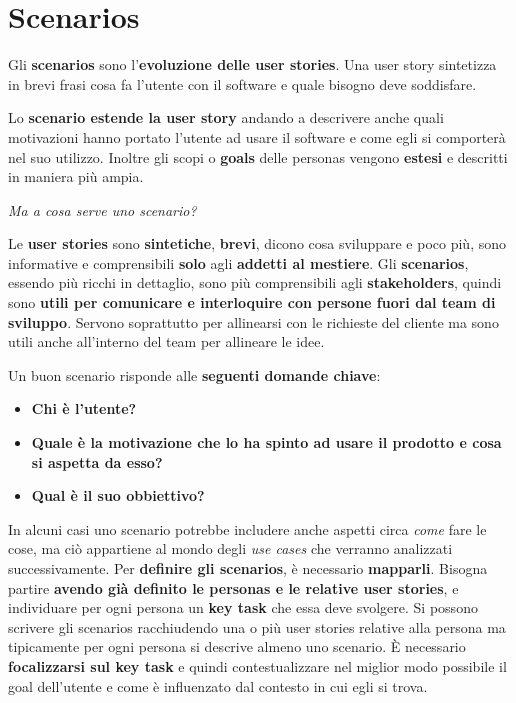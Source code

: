 \documentclass[a4paper,11pt,oneside]{book}
\begin{document}
\section{Scenarios}

Gli \textbf{scenarios} sono l'\textbf{evoluzione delle user stories}. Una user story sintetizza in brevi frasi cosa fa l'utente con il software e quale bisogno deve soddisfare.

Lo \textbf{scenario estende la user story} andando a descrivere anche quali motivazioni hanno portato l'utente ad usare il software e come egli si comporterà nel suo utilizzo. Inoltre gli scopi o \textbf{goals} delle personas vengono \textbf{estesi} e descritti in maniera più ampia.

\begin{flushleft}
	\textit{Ma a cosa serve uno scenario?}
\end{flushleft}

Le \textbf{user stories} sono \textbf{sintetiche}, \textbf{brevi}, dicono cosa sviluppare e poco più, sono informative e comprensibili \textbf{solo} agli \textbf{addetti al mestiere}. Gli \textbf{scenarios}, essendo più ricchi in dettaglio, sono più comprensibili agli \textbf{stakeholders}, quindi sono \textbf{utili per comunicare e interloquire con persone fuori dal team di sviluppo}. Servono soprattutto per allinearsi con le richieste del cliente ma sono  utili anche all'interno del team per allineare le idee.

Un buon scenario risponde alle \textbf{seguenti domande chiave}:

\begin{itemize}
	\item \textbf{Chi è l'utente?}
	\item \textbf{Quale è la motivazione che lo ha spinto ad usare il prodotto e cosa si aspetta da esso?}
	\item \textbf{Qual è il suo obbiettivo?}
\end{itemize}

In alcuni casi uno scenario potrebbe includere anche aspetti circa \textit{come} fare le cose, ma ciò appartiene al mondo degli \textit{use cases} che verranno analizzati successivamente.
Per \textbf{definire gli scenarios}, è necessario \textbf{mapparli}. Bisogna partire \textbf{avendo già definito le personas e le relative user stories}, e individuare per ogni persona un \textbf{key task} che essa deve svolgere. Si possono scrivere gli scenarios racchiudendo una o più
user stories relative alla persona ma tipicamente per ogni persona si descrive  almeno uno scenario. È necessario \textbf{focalizzarsi sul key task} e quindi contestualizzare nel miglior modo possibile il goal dell'utente e come è influenzato dal contesto in cui egli si trova.
\end{document}
